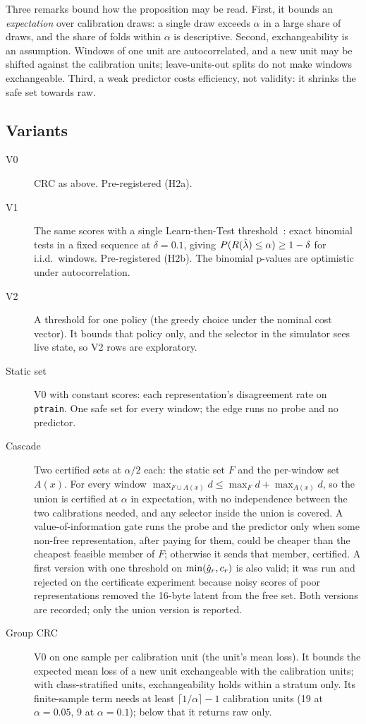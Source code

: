 Three remarks bound how the proposition may be read. First, it bounds an \emph{expectation} over
calibration draws: a single draw exceeds $\alpha$ in a large share of draws, and the share of folds
within $\alpha$ is descriptive. Second, exchangeability is an assumption. Windows of one unit are
autocorrelated, and a new unit may be shifted against the calibration units; leave-units-out splits
do not make windows exchangeable. Third, a weak predictor costs efficiency, not validity: it
shrinks the safe set towards raw.

\subsection{Variants}

\begin{description}
  \item[V0] CRC as above. Pre-registered (H2a).
  \item[V1] The same scores with a single Learn-then-Test threshold~\cite{angelopoulos2021ltt}:
  exact binomial tests in a fixed sequence at $\delta = 0.1$, giving
  $P(R(\hat\lambda) \le \alpha) \ge 1-\delta$ for i.i.d.\ windows. Pre-registered (H2b). The binomial
  p-values are optimistic under autocorrelation.
  \item[V2] A threshold for one policy (the greedy choice under the nominal cost vector). It bounds
  that policy only, and the selector in the simulator sees live state, so V2 rows are exploratory.
  \item[Static set\expl] V0 with constant scores: each representation's disagreement rate on
  \texttt{ptrain}. One safe set for every window; the edge runs no probe and no predictor.
  \item[Cascade\expl] Two certified sets at $\alpha/2$ each: the static set $F$ and the per-window
  set $A(x)$. For every window $\max_{F\cup A(x)} d \le \max_F d + \max_{A(x)} d$, so the union is
  certified at $\alpha$ in expectation, with no independence between the two calibrations needed,
  and any selector inside the union is covered. A value-of-information gate runs the probe and the
  predictor only when some non-free representation, after paying for them, could be cheaper than
  the cheapest feasible member of $F$; otherwise it sends that member, certified. A first version
  with one threshold on $\min(\hat g_r, c_r)$ is also valid; it was run and rejected on the
  certificate experiment because noisy scores of poor representations removed the 16-byte latent
  from the free set. Both versions are recorded; only the union version is reported.
  \item[Group CRC\expl] V0 on one sample per calibration unit (the unit's mean loss). It bounds the
  expected mean loss of a new unit exchangeable with the calibration units; with class-stratified
  units, exchangeability holds within a stratum only. Its finite-sample term needs at least
  $\lceil 1/\alpha\rceil - 1$ calibration units (19 at $\alpha=0.05$, 9 at $\alpha=0.1$); below
  that it returns raw only.
\end{description}


